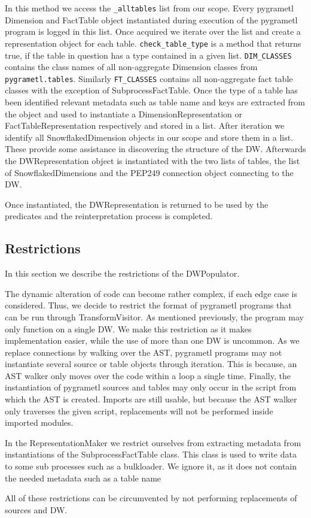 In this method we access the \texttt{\_alltables} list from our scope. Every pygrametl Dimension and FactTable object instantiated during execution of the pygrametl program is logged in this list. Once acquired we iterate over the list and create a representation object for each table. \texttt{check\_table\_type} is a method that returns true, if the table in question has a type contained in a given list. \texttt{DIM\_CLASSES} contains the class names of all non-aggregate Dimension classes from \texttt{pygrametl.tables}. Similarly \texttt{FT\_CLASSES} contains all non-aggregate fact table classes with the exception of SubprocessFactTable. Once the type of a table has been identified relevant metadata such as table name and keys are extracted from the object and used to instantiate a DimensionRepresentation or FactTableRepresentation respectively and stored in a list. After iteration we identify all SnowflakedDimension objects in our scope and store them in a list. These provide some assistance in discovering the structure of the DW. Afterwards the DWRepresentation object is instantiated with the two lists of tables, the list of SnowflakedDimensions and the PEP249 connection object connecting to the DW.

Once instantiated, the DWRepresentation is returned to be used by the predicates and the reinterpretation process is completed.

\subsection{Restrictions}
In this section we describe the restrictions of the DWPopulator. 

The dynamic alteration of code can become rather complex, if each edge case is considered. Thus, we decide to restrict the format of pygrametl programs that can be run through TransformVisitor. As mentioned previously, the program may only function on a single DW. We make this restriction as it makes implementation easier, while the use of more than one DW is uncommon. As we replace connections by walking over the AST, pygrametl programs may not instantiate several source or table objects through iteration. This is because, an AST walker only moves over the code within a loop a single time. Finally, the instantiation of pygrametl sources and tables may only occur in the script from which the AST is created. Imports are still usable, but because the AST walker only traverses the given script, replacements will not be performed inside imported modules.

In the RepresentationMaker we restrict ourselves from extracting metadata from instantiations of the SubprocessFactTable class. This class is used to write data to some sub processes such as a bulkloader. We ignore it, as it does not contain the needed metadata such as a table name

 All of these restrictions can be circumvented by not performing replacements of sources and DW. 

